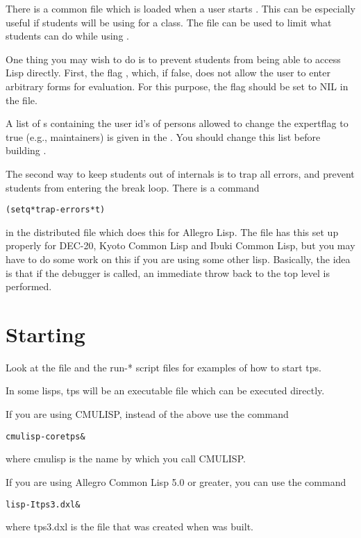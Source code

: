 There is a common  file which is loaded when a user starts {\ETPS}.
This can be especially useful if students will be using {\ETPS} for a class.
The  file can be used to limit what students can
do while using {\ETPS}.

One thing you may wish to do is to prevent students from being able to
access Lisp directly.
First, the flag , which, if false, does not allow the user to
enter arbitrary forms for evaluation.
For this purpose, the flag  should be set to NIL
in the  file.

A list of s containing
the user id's of persons allowed to change the expertflag to true (e.g.,
maintainers) is given in the .  You should change this list
before building {\ETPS}.

The second way to keep students out of {\TPS} internals is to trap all
errors, and prevent students from entering the break loop.
There is a command
\begin{alltt}
(setq *trap-errors* t)
\end{alltt}
in the distributed  file which
does this for Allegro Lisp.
The file  has this
set up properly for DEC-20, Kyoto Common Lisp and Ibuki Common Lisp,
but you may have to do some work on this if you are using some other lisp.
Basically, the idea is that if the debugger is called, an immediate
throw back to the top level is performed.


\section{Starting {\TPS}}

Look at the  file and the run-* script files
for examples of how to start tps.

In some lisps, tps will be an executable file which can be
executed directly.

If you are using CMULISP, instead of the above use the command
\begin{alltt}
cmulisp -core tps \&
\end{alltt}
where cmulisp is the name by which you call CMULISP.

If you are using Allegro Common Lisp 5.0 or greater, you can use the command
\begin{alltt}
lisp -I tps3.dxl \&
\end{alltt}
where tps3.dxl is the file that was created when {\TPS} was built.

